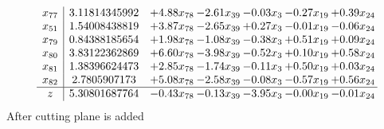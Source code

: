 \documentclass[8pt]{article}
\begin{document}
\[\begin{array}{c| c c@{\hskip 2pt} c@{\hskip 2pt} c@{\hskip 2pt} c@{\hskip 2pt} c@{\hskip 2pt} }
 x_{77}   &  3.11814345992 & +  4.88 x_{78} & -2.61 x_{39} & -0.03 x_{3} & -0.27 x_{19} & +  0.39 x_{24}\\
 x_{51}   &  1.54008438819 & +  3.87 x_{78} & -2.65 x_{39} & +  0.27 x_{3} & -0.01 x_{19} & -0.06 x_{24}\\
 x_{79}   &  0.84388185654 & +  1.98 x_{78} & -1.08 x_{39} & -0.38 x_{3} & +  0.51 x_{19} & +  0.09 x_{24}\\
 x_{80}   &  3.83122362869 & +  6.60 x_{78} & -3.98 x_{39} & -0.52 x_{3} & +  0.10 x_{19} & +  0.58 x_{24}\\
 x_{81}   &  1.38396624473 & +  2.85 x_{78} & -1.74 x_{39} & -0.11 x_{3} & +  0.50 x_{19} & +  0.03 x_{24}\\
 x_{82}   &  2.7805907173 & +  5.08 x_{78} & -2.58 x_{39} & -0.08 x_{3} & -0.57 x_{19} & +  0.56 x_{24}\\
\hline
z    &  5.30801687764 & -0.43 x_{78} & -0.13 x_{39} & -3.95 x_{3} & -0.00 x_{19} & -0.01 x_{24}\\
\end{array}\]
 After cutting plane is added 
\end{document}
